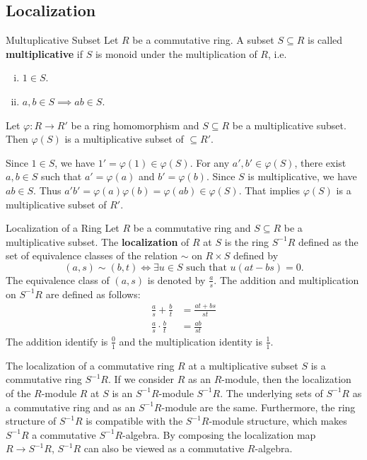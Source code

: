 \subsection{Localization}
\begin{definition}{Multuplicative Subset}{}
    Let $R$ be a commutative ring. A subset $S\subseteq R$ is called \textbf{multiplicative} if $S$ is monoid under the multiplication of $R$, i.e.
    \begin{enumerate}[(i)]
        \item $1\in S$.
        \item $a,b\in S\implies ab\in S$.
    \end{enumerate}
\end{definition}
\begin{proposition}
    Let $\varphi:R\to R'$ be a ring homomorphism and $S\subseteq R$ be a multiplicative subset. Then $\varphi(S)$ is a multiplicative subset of $\subseteq R'$.
\end{proposition}
\begin{prf}
    Since $1\in S$, we have $1'=\varphi(1)\in \varphi(S)$. For any $a',b'\in \varphi(S)$, there exist $a,b\in S$ such that $a'=\varphi(a)$ and $b'=\varphi(b)$. Since $S$ is multiplicative, we have $ab\in S$. Thus $a'b'=\varphi(a)\varphi(b)=\varphi(ab)\in \varphi(S)$. That implies $\varphi(S)$ is a multiplicative subset of $R'$.
\end{prf}

\begin{definition}{Localization of a Ring}{}
    Let $R$ be a commutative ring and $S\subseteq R$ be a multiplicative subset. The \textbf{localization} of $R$ at $S$ is the ring $S^{-1}R$ defined as the set of equivalence classes of the relation $\sim$ on $R\times S$ defined by $$(a,s)\sim (b,t)\iff \exists u\in S\text{ such that }u(at-bs)=0.$$
    The equivalence class of $(a,s)$ is denoted by $\frac{a}{s}$. The addition and multiplication on $S^{-1}R$ are defined as follows:
    \begin{align*}
        \frac{a}{s}+\frac{b}{t}&=\frac{at+bs}{st}\\
        \frac{a}{s}\cdot\frac{b}{t}&=\frac{ab}{st}
    \end{align*}
    The addition identify is $\frac{0}{1}$ and the multiplication identity is $\frac{1}{1}$.
\end{definition}

The localization of a commutative ring $R$ at a multiplicative subset $S$ is a commutative ring $S^{-1}R$. If we consider $R$ as an $R$-module, then the localization of the $R$-module $R$ at $S$ is an $S^{-1}R$-module $S^{-1}R$. The underlying sets of $S^{-1}R$ as a commutative ring and as an $S^{-1}R$-module are the same. Furthermore, the ring structure of $S^{-1}R$ is compatible with the $S^{-1}R$-module structure, which makes $S^{-1}R$ a commutative $S^{-1}R$-algebra. By composing the localization map $R\to S^{-1}R$, $S^{-1}R$ can also be viewed as a commutative $R$-algebra.

